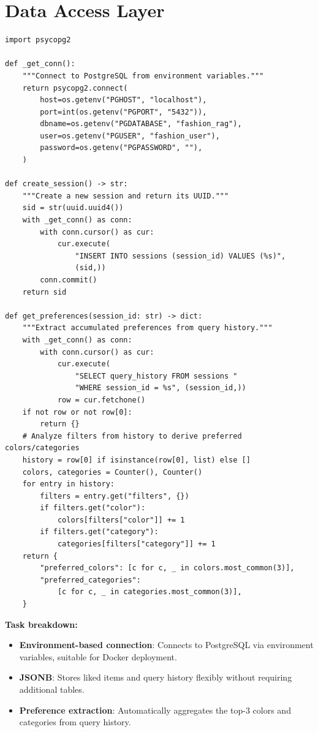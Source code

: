 \documentclass[12pt, twoside]{report}
\begin{document}
\section{Data Access Layer}

\begin{lstlisting}[caption={PostgreSQL Data Access Layer --- agent/memory.py}]
import psycopg2

def _get_conn():
    """Connect to PostgreSQL from environment variables."""
    return psycopg2.connect(
        host=os.getenv("PGHOST", "localhost"),
        port=int(os.getenv("PGPORT", "5432")),
        dbname=os.getenv("PGDATABASE", "fashion_rag"),
        user=os.getenv("PGUSER", "fashion_user"),
        password=os.getenv("PGPASSWORD", ""),
    )

def create_session() -> str:
    """Create a new session and return its UUID."""
    sid = str(uuid.uuid4())
    with _get_conn() as conn:
        with conn.cursor() as cur:
            cur.execute(
                "INSERT INTO sessions (session_id) VALUES (%s)",
                (sid,))
        conn.commit()
    return sid

def get_preferences(session_id: str) -> dict:
    """Extract accumulated preferences from query history."""
    with _get_conn() as conn:
        with conn.cursor() as cur:
            cur.execute(
                "SELECT query_history FROM sessions "
                "WHERE session_id = %s", (session_id,))
            row = cur.fetchone()
    if not row or not row[0]:
        return {}
    # Analyze filters from history to derive preferred colors/categories
    history = row[0] if isinstance(row[0], list) else []
    colors, categories = Counter(), Counter()
    for entry in history:
        filters = entry.get("filters", {})
        if filters.get("color"):
            colors[filters["color"]] += 1
        if filters.get("category"):
            categories[filters["category"]] += 1
    return {
        "preferred_colors": [c for c, _ in colors.most_common(3)],
        "preferred_categories":
            [c for c, _ in categories.most_common(3)],
    }
\end{lstlisting}

\textbf{Task breakdown:}
\begin{itemize}
    \item \textbf{Environment-based connection}: Connects to PostgreSQL via environment variables, suitable for Docker deployment.
    \item \textbf{JSONB}: Stores liked items and query history flexibly without requiring additional tables.
    \item \textbf{Preference extraction}: Automatically aggregates the top-3 colors and categories from query history.
\end{itemize}
\end{document}

